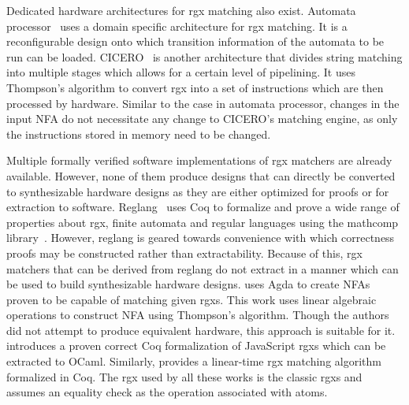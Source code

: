 Dedicated hardware architectures for \gls{rgx} matching also exist.
Automata processor~\cite{micronAP} uses a domain specific architecture
for \gls{rgx} matching.
It is a reconfigurable design onto which transition information of the
automata to be run can be loaded.
%
%
CICERO~\cite{cicero} is another architecture that divides string
matching into multiple stages which allows for a certain level of
pipelining.
It uses Thompson's algorithm to convert \gls{rgx} into a set of
instructions which are then processed by hardware.
%
Similar to the case in automata processor, changes in the input
\gls{NFA} do not necessitate any change to CICERO's matching engine,
as only the instructions stored in memory need to be changed.



Multiple formally verified software implementations of \gls{rgx}
matchers are already available.
However, none of them produce designs that can directly be
converted to synthesizable hardware designs as they are either
optimized for proofs or for extraction to software.
Reglang~\cite{reglang} uses Coq to formalize and prove a wide range of
properties about \gls{rgx}, finite automata and regular languages
using the mathcomp library~\cite{mathcompbook}.
However, reglang is geared towards convenience with which correctness
proofs may be constructed rather than extractability.
Because of this, \gls{rgx} matchers that can be derived from reglang do not
extract in a manner which can be used to build synthesizable hardware designs.
\citet{firsov2013} uses Agda to create \glspl{NFA} proven to be
capable of matching given \glspl{rgx}.
This work uses linear algebraic operations to construct \gls{NFA}
using Thompson's algorithm.
Though the authors did not attempt to produce equivalent hardware, this
approach is suitable for it.
\citet{noeRegex} introduces a proven correct Coq formalization of
JavaScript \glspl{rgx} which can be extracted to OCaml.
Similarly, \citet{rice2025} provides a linear-time \gls{rgx} matching
algorithm formalized in Coq.
The \gls{rgx} used by all these works is the classic \glspl{rgx} and
assumes an equality check as the operation associated with atoms.
